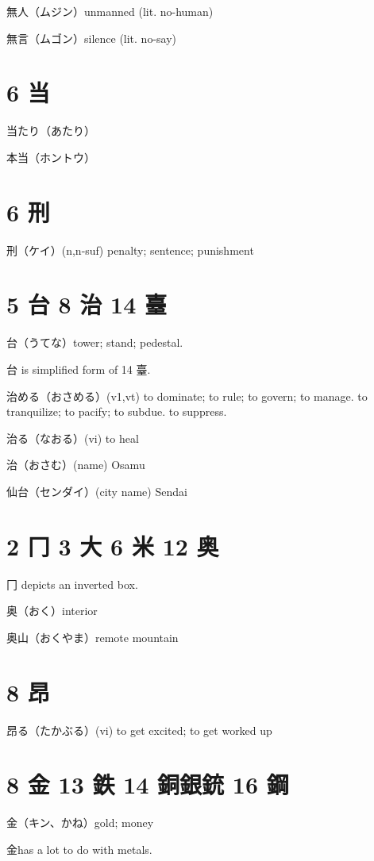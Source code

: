無人（ムジン）unmanned (lit. no-human)

無言（ムゴン）silence (lit. no-say)

\section{6 当}

当たり（あたり）

本当（ホントウ）

\section{6 刑}

刑（ケイ）(n,n-suf) penalty; sentence; punishment

\section{5 台 8 治 14 臺}

台（うてな）tower; stand; pedestal.

台 is simplified form of 14 臺.

治める（おさめる）(v1,vt)
to dominate; to rule; to govern; to manage.
to tranquilize; to pacify; to subdue.
to suppress.

治る（なおる）(vi) to heal

治（おさむ）(name) Osamu

仙台（センダイ）(city name) Sendai

\section{2 冂 3 大 6 米 12 奥}

冂 depicts an inverted box.

奥（おく）interior

奥山（おくやま）remote mountain

\section{8 昂}

昂る（たかぶる）(vi) to get excited; to get worked up

\section{8 金 13 鉄 14 銅銀銃 16 鋼}

金（キン、かね）gold; money

金has a lot to do with metals.

